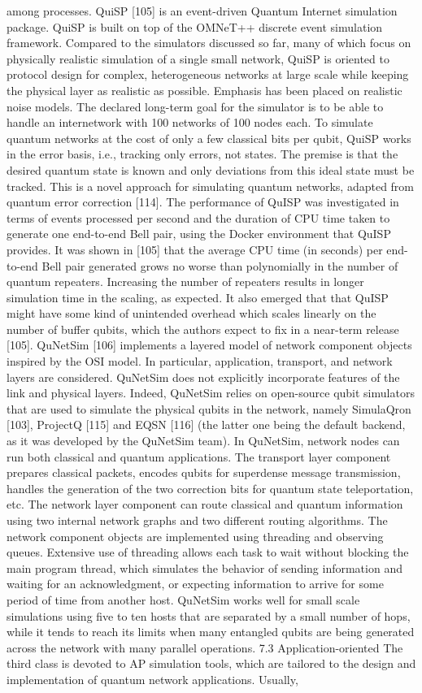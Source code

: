among processes. QuiSP [105] is an event-driven Quantum Internet simulation package. QuiSP is built on top of the OMNeT++ discrete event simulation framework. Compared to the simulators discussed so far, many of which focus on physically realistic simulation of a single small network, QuiSP is oriented to protocol design for complex, heterogeneous networks at large scale while keeping the physical layer as realistic as possible. Emphasis has been placed on realistic noise models. The declared long-term goal for the simulator is to be able to handle an internetwork with 100 networks of 100 nodes each. To simulate quantum networks at the cost of only a few classical bits per qubit, QuiSP works in the error basis, i.e., tracking only errors, not states. The premise is that the desired quantum state is known and only deviations from this ideal state must be tracked. This is a novel approach for simulating quantum networks, adapted from quantum error correction [114]. The performance of QuISP was investigated in terms of events processed per second and the duration of CPU time taken to generate one end-to-end Bell pair, using the Docker environment that QuISP provides. It was shown in [105] that the average CPU time (in seconds) per end-to-end Bell pair generated grows no worse than polynomially in the number of quantum repeaters. Increasing the number of repeaters results in longer simulation time in the scaling, as expected. It also emerged that that QuISP might have some kind of unintended overhead which scales linearly on the number of buffer qubits, which the authors expect to fix in a near-term release [105]. QuNetSim [106] implements a layered model of network component objects inspired by the OSI model. In particular, application, transport, and network layers are considered. QuNetSim does not explicitly incorporate features of the link and physical layers. Indeed, QuNetSim relies on open-source qubit simulators that are used to simulate the physical qubits in the network, namely SimulaQron [103], ProjectQ [115] and EQSN [116] (the latter one being the default backend, as it was developed by the QuNetSim team). In QuNetSim, network nodes can run both classical and quantum applications. The transport layer component prepares classical packets, encodes qubits for superdense message transmission, handles the generation of the two correction bits for quantum state teleportation, etc. The network layer component can route classical and quantum information using two internal network graphs and two different routing algorithms. The network component objects are implemented using threading and observing queues. Extensive use of threading allows each task to wait without blocking the main program thread, which simulates the behavior of sending information and waiting for an acknowledgment, or expecting information to arrive for some period of time from another host. QuNetSim works well for small scale simulations using five to ten hosts that are separated by a small number of hops, while it tends to reach its limits when many entangled qubits are being generated across the network with many parallel operations. 7.3 Application-oriented The third class is devoted to AP simulation tools, which are tailored to the design and implementation of quantum network applications. Usually, 